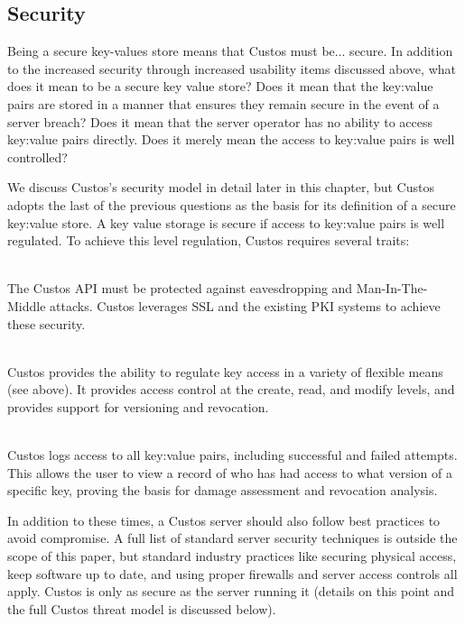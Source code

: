 \subsection{Security}

Being a secure key-values store means that Custos must be... secure.
In addition to the increased security through increased usability
items discussed above, what does it mean to be a secure key value
store? Does it mean that the key:value pairs are stored in a manner
that ensures they remain secure in the event of a server breach? Does
it mean that the server operator has no ability to access key:value
pairs directly. Does it merely mean the access to key:value pairs is
well controlled?

We discuss Custos's security model in detail later in this chapter,
but Custos adopts the last of the previous questions as the basis for
its definition of a secure key:value store. A key value storage is
secure if access to key:value pairs is well regulated. To achieve this
level regulation, Custos requires several traits:

\begin{packed_desc}
\item[Secure Communication Primitives] \hfill \\ The Custos API must
  be protected against eavesdropping and Man-In-The-Middle
  attacks. Custos leverages SSL and the existing PKI systems to
  achieve these security.
\item[Access Control] \hfill \\ Custos provides the ability to
  regulate key access in a variety of flexible means (see above). It
  provides access control at the create, read, and modify levels, and
  provides support for versioning and revocation.
\item[Access Auditing] \hfill \\ Custos logs access to all key:value
  pairs, including successful and failed attempts. This allows the
  user to view a record of who has had access to what version of a
  specific key, proving the basis for damage assessment and revocation
  analysis.
\end{packed_desc}

In addition to these times, a Custos server should also follow best
practices to avoid compromise. A full list of standard server security
techniques is outside the scope of this paper, but standard industry
practices like securing physical access, keep software up to date, and
using proper firewalls and server access controls all apply. Custos is
only as secure as the server running it (details on this point and the
full Custos threat model is discussed below).

